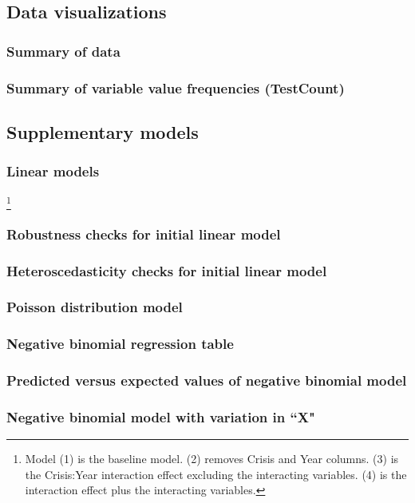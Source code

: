 \documentclass[12pt]{article}
\begin{document}
\subsection{Data visualizations}
\subsubsection{Summary of data} 
\subsubsection{Summary of variable value frequencies (TestCount)}

\subsection{Supplementary models} 
\subsubsection{Linear models}\footnote{Model (1) is the baseline model. (2) removes Crisis and Year columns. (3) is the Crisis:Year interaction effect excluding the interacting variables. (4) is the interaction effect plus the interacting variables.}
\subsubsection{Robustness checks for initial linear model}
\subsubsection{Heteroscedasticity checks for initial linear model} 
\subsubsection{Poisson distribution model} 
\subsubsection{Negative binomial regression table}
\subsubsection{Predicted versus expected values of negative binomial model} 
\subsubsection{Negative binomial model with variation in “X"}
\end{document}
